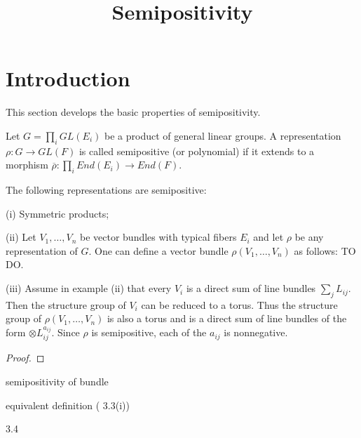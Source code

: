 


\newcommand{\todo}[1]{\footnote{\textbf{TODO.} #1}}


\title{Semipositivity}
\maketitle

\section{Introduction}
This section develops the basic properties of semipositivity.


\begin{definition}
Let $G=\prod_i GL(E_i)$ be a product of general linear groups. A representation $\rho:G\rightarrow GL(F)$ is called semipositive (or polynomial) if it extends to a morphism $\overline{\rho}:\prod_i End(E_i)\rightarrow End(F)$.
\end{definition}

\begin{lemma}
The following representations are semipositive:
\item[(i)] Symmetric products;
\item[(ii)] Let $V_1, \dots, V_n$ be vector bundles with typical fibers $E_i$ and let $\rho$ be any representation of $G$. One can define a vector bundle $\rho(V_1,\dots,V_n)$ as follows: TO DO.
\item[(iii)] Assume in example (ii) that every $V_i$ is a direct sum of line bundles $\sum_j L_{ij}$. Then the structure group of  $V_i$ can be reduced to a torus. Thus the structure group of $\rho(V_1,\dots, V_n)$ is also a torus and is a direct sum of line bundles of the form $\otimes L_{ij}^{a_{ij}}$. Since $\rho$ is semipositive, each of the $a_{ij}$ is nonnegative.
\end{lemma}


\begin{proof}

\end{proof}


\begin{definition}
semipositivity of bundle
\end{definition}

\begin{lemma}
equivalent definition ( 3.3(i))
\end{lemma}

\begin{lemma}
3.4
\end{lemma}

